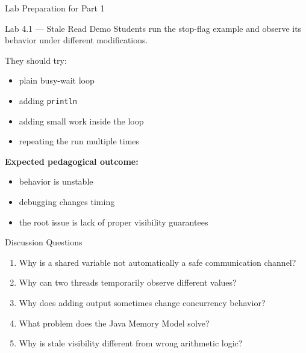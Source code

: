 \documentclass[aspectratio=169,11pt]{beamer}
\begin{document}
	\begin{frame}{Lab Preparation for Part 1}
		\begin{block}{Lab 4.1 --- Stale Read Demo}
			Students run the stop-flag example and observe its behavior under different modifications.
		\end{block}
		
		\vspace{0.2cm}
		
		They should try:
		\begin{itemize}
			\item plain busy-wait loop
			\item adding \texttt{println}
			\item adding small work inside the loop
			\item repeating the run multiple times
		\end{itemize}
		
		\vspace{0.3cm}
		
		\textbf{Expected pedagogical outcome:}
		\begin{itemize}
			\item behavior is unstable
			\item debugging changes timing
			\item the root issue is lack of proper visibility guarantees
		\end{itemize}
	\end{frame}
	
	\begin{frame}{Discussion Questions}
		\begin{enumerate}
			\item Why is a shared variable not automatically a safe communication channel?
			\item Why can two threads temporarily observe different values?
			\item Why does adding output sometimes change concurrency behavior?
			\item What problem does the Java Memory Model solve?
			\item Why is stale visibility different from wrong arithmetic logic?
		\end{enumerate}
	\end{frame}
	
\end{document}
